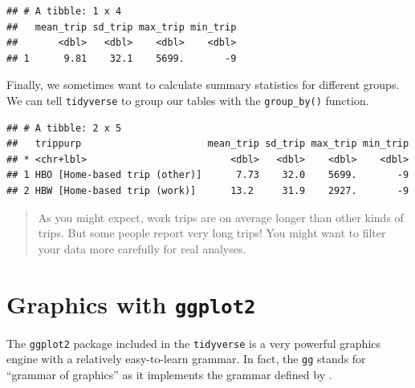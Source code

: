 \documentclass[
]{book}
\newenvironment{Shaded}{\begin{snugshade}}{\end{snugshade}}
\newcommand{\DataTypeTok}[1]{\textcolor[rgb]{0.13,0.29,0.53}{#1}}
\newcommand{\KeywordTok}[1]{\textcolor[rgb]{0.13,0.29,0.53}{\textbf{#1}}}
\newcommand{\NormalTok}[1]{#1}
\newcommand{\OperatorTok}[1]{\textcolor[rgb]{0.81,0.36,0.00}{\textbf{#1}}}
\newcommand{\StringTok}[1]{\textcolor[rgb]{0.31,0.60,0.02}{#1}}
\begin{document}
\begin{verbatim}
## # A tibble: 1 x 4
##   mean_trip sd_trip max_trip min_trip
##       <dbl>   <dbl>    <dbl>    <dbl>
## 1      9.81    32.1    5699.       -9
\end{verbatim}

Finally, we sometimes want to calculate summary statistics for different groups.
We can tell \texttt{tidyverse} to group our tables with the \texttt{group\_by()} function.

\begin{Shaded}
\end{Shaded}

\begin{verbatim}
## # A tibble: 2 x 5
##   trippurp                      mean_trip sd_trip max_trip min_trip
## * <chr+lbl>                         <dbl>   <dbl>    <dbl>    <dbl>
## 1 HBO [Home-based trip (other)]      7.73    32.0    5699.       -9
## 2 HBW [Home-based trip (work)]      13.2     31.9    2927.       -9
\end{verbatim}

\begin{quote}
As you might expect, work trips are on average longer than other kinds of trips.
But some people report very long trips! You might want to filter your data more
carefully for real analyses.
\end{quote}

\hypertarget{graphics-with-ggplot2}{%
\section{\texorpdfstring{Graphics with \texttt{ggplot2}}{Graphics with ggplot2}}\label{graphics-with-ggplot2}}

The \texttt{ggplot2} package included in the \texttt{tidyverse} is a very powerful graphics
engine with a relatively easy-to-learn grammar. In fact, the \texttt{gg} stands for
``grammar of graphics'' as it implements the grammar defined by
\citet{wilkinson2012grammar}.
\end{document}
